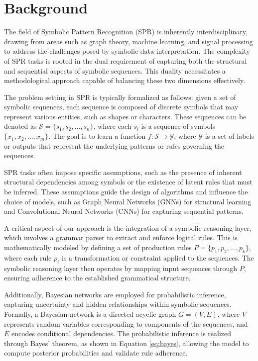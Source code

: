 \documentclass{article}
\begin{document}
\section{Background}
The field of Symbolic Pattern Recognition (SPR) is inherently interdisciplinary, drawing from areas such as graph theory, machine learning, and signal processing to address the challenges posed by symbolic data interpretation. The complexity of SPR tasks is rooted in the dual requirement of capturing both the structural and sequential aspects of symbolic sequences. This duality necessitates a methodological approach capable of balancing these two dimensions effectively.

The problem setting in SPR is typically formalized as follows: given a set of symbolic sequences, each sequence is composed of discrete symbols that may represent various entities, such as shapes or characters. These sequences can be denoted as \( \mathcal{S} = \{s_1, s_2, \ldots, s_n\} \), where each \( s_i \) is a sequence of symbols \( \{x_1, x_2, \ldots, x_m\} \). The goal is to learn a function \( f: \mathcal{S} \rightarrow \mathcal{Y} \), where \( \mathcal{Y} \) is a set of labels or outputs that represent the underlying patterns or rules governing the sequences.

SPR tasks often impose specific assumptions, such as the presence of inherent structural dependencies among symbols or the existence of latent rules that must be inferred. These assumptions guide the design of algorithms and influence the choice of models, such as Graph Neural Networks (GNNs) for structural learning and Convolutional Neural Networks (CNNs) for capturing sequential patterns.

A critical aspect of our approach is the integration of a symbolic reasoning layer, which involves a grammar parser to extract and enforce logical rules. This is mathematically modeled by defining a set of production rules \( P = \{p_1, p_2, \ldots, p_k\} \), where each rule \( p_i \) is a transformation or constraint applied to the sequences. The symbolic reasoning layer then operates by mapping input sequences through \( P \), ensuring adherence to the established grammatical structure.

Additionally, Bayesian networks are employed for probabilistic inference, capturing uncertainty and hidden relationships within symbolic sequences. Formally, a Bayesian network is a directed acyclic graph \( G = (V, E) \), where \( V \) represents random variables corresponding to components of the sequences, and \( E \) encodes conditional dependencies. The probabilistic inference is realized through Bayes' theorem, as shown in Equation \ref{eq:bayes}, allowing the model to compute posterior probabilities and validate rule adherence.
\end{document}
